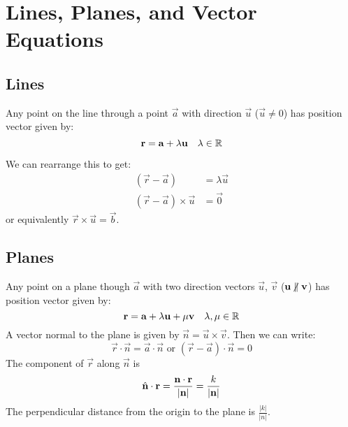 \documentclass[../main.tex]{subfiles}
\begin{document}
\section{Lines, Planes, and Vector Equations}
\subsection{Lines}
Any point on the line through a point $\vec{a}$ with direction $\vec{u}$ ($\vec{u} \neq 0$) has position vector given by:
\[
  \boldsymbol{\mathbf{r}} = \boldsymbol{\mathbf{a}} + \lambda \boldsymbol{\mathbf{u}} \quad \lambda \in \mathbb{R}
\]

\begin{center}
\end{center}
We can rearrange this to get:
\begin{align*}
  (\vec{r} - \vec{a}) &= \lambda \vec{u} \\
  (\vec{r} - \vec{a}) \times \vec{u} &= \vec{0}
\end{align*}
or equivalently $\vec{r} \times \vec{u} = \vec{b}$.
\subsection{Planes}
Any point on a plane though $\vec{a}$ with two direction vectors $\vec{u}$, $\vec{v}$ ($\vec{u} \centernot\parallel \vec{v}$) has position vector given by:
\[
  \boldsymbol{\mathbf{r}} = \boldsymbol{\mathbf{a}} + \lambda \boldsymbol{\mathbf{u}} + \mu \boldsymbol{\mathbf{v}} \quad \lambda, \mu \in \mathbb{R}
\]
A vector normal to the plane is given by $\vec{n} = \vec{u} \times \vec{v}$. Then we can write:
\[
  \vec{r} \cdot \vec{n} = \vec{a} \cdot \vec{n} \text{ or } (\vec{r} - \vec{a}) \cdot \vec{n} = 0
\]
The component of $\vec{r}$ along $\vec{n}$ is
\[
  \hat{\mathbf{n}} \cdot \boldsymbol{\mathbf{r}} = \frac{\boldsymbol{\mathbf{n}} \cdot \boldsymbol{\mathbf{r}}}{|\boldsymbol{\mathbf{n}}|} = \frac{k}{|\boldsymbol{\mathbf{n}}|}
\]
The perpendicular distance from the origin to the plane is $\frac{|k|}{|n|}$.
\end{document}

